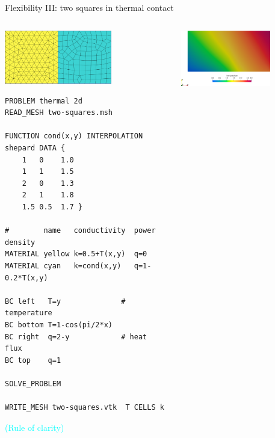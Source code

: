 \documentclass[
  ignorenonframetext,
  aspectratio=169,
]{beamer}
\begin{document}
\begin{frame}[fragile]{Flexibility III: two squares in thermal contact}
\protect\hypertarget{flexibility-iii-two-squares-in-thermal-contact}{}
\begin{columns}[T]
\begin{column}{0.5\textwidth}
\centering \includegraphics[width=0.65\textwidth,height=\textheight]{two-squares-mesh.svg}

\begin{lstlisting}[style=feenox]
PROBLEM thermal 2d
READ_MESH two-squares.msh

FUNCTION cond(x,y) INTERPOLATION shepard DATA {
    1   0    1.0
    1   1    1.5
    2   0    1.3
    2   1    1.8
    1.5 0.5  1.7 }

#        name   conductivity  power density
MATERIAL yellow k=0.5+T(x,y)  q=0
MATERIAL cyan   k=cond(x,y)   q=1-0.2*T(x,y)
    
BC left   T=y              # temperature
BC bottom T=1-cos(pi/2*x)
BC right  q=2-y            # heat flux
BC top    q=1

SOLVE_PROBLEM
 
WRITE_MESH two-squares.vtk  T CELLS k
\end{lstlisting}

\vspace{-0.25cm}\hfill{\footnotesize\textcolor{cyan}{(Rule of {clarity})}}
\end{column}

\pause

\begin{column}{0.5\textwidth}
\centering \includegraphics[width=0.7\textwidth,height=\textheight]{two-squares-temperature.png}


\end{column}
\end{columns}
\end{frame}
\end{document}
